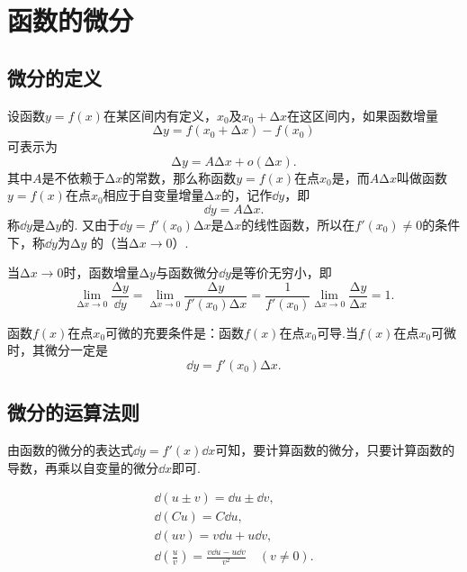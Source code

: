 \section{函数的微分}
\subsection{微分的定义}
\begin{definition}
设函数\(y=f(x)\)在某区间内有定义，\(x_0\)及\(x_0+\increment x\)在这区间内，如果函数增量\[
\increment y=f(x_0+\increment x)-f(x_0)
\]可表示为\[
\increment y=A\increment x+o(\increment x).
\]其中\(A\)是不依赖于\(\increment x\)的常数，那么称函数\(y=f(x)\)在点\(x_0\)是，而\(A\increment x\)叫做函数\(y=f(x)\)在点\(x_0\)相应于自变量增量\(\increment x\)的，记作\(\dd{y}\)，即\[
\dd{y}=A\increment x.
\]称\(\dd{y}\)是\(\increment y\)的.
又由于\(\dd{y}=f'(x_0)\increment x\)是\(\increment x\)的线性函数，所以在\(f'(x_0) \neq 0\)的条件下，称\(\dd{y}\)为\(\increment y\) 的（当\(\increment x\to0\)）.
\end{definition}

\begin{property}
当\(\increment x\to0\)时，函数增量\(\increment y\)与函数微分\(\dd{y}\)是等价无穷小，即\[
\lim\limits_{\increment x\to0} \frac{\increment y}{\dd{y}}
= \lim\limits_{\increment x\to0} \frac{\increment y}{f'(x_0) \increment x}
= \frac{1}{f'(x_0)} \lim\limits_{\increment x\to0} \frac{\increment y}{\increment x}
= 1.
\]
\end{property}

\begin{theorem}
函数\(f(x)\)在点\(x_0\)可微的充要条件是：函数\(f(x)\)在点\(x_0\)可导.当\(f(x)\)在点\(x_0\)可微时，其微分一定是\[
\dd{y}=f'(x_0)\increment x.
\]
\end{theorem}

\subsection{微分的运算法则}
由函数的微分的表达式\(\dd{y} = f'(x) \dd{x}\)可知，要计算函数的微分，只要计算函数的导数，再乘以自变量的微分\(\dd{x}\)即可.

\begin{theorem}
\begin{gather}
	\dd(u \pm v) = \dd{u}\pm\dd{v}, \\
	\dd(C u) = C \dd{u}, \\
	\dd(u v) = v \dd{u} + u \dd{v}, \\
	\dd(\frac{u}{v}) = \frac{v \dd{u} - u \dd{v}}{v^2} \quad (v \neq 0).
\end{gather}
\end{theorem}

